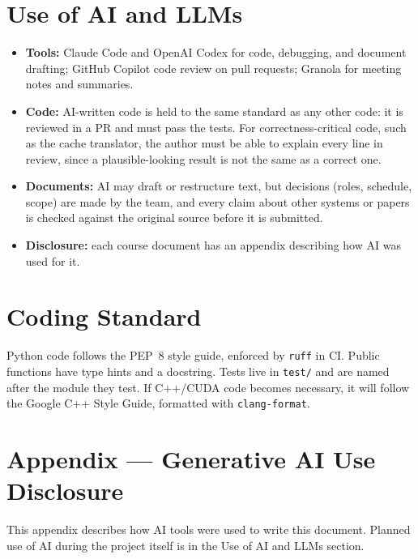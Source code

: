 \documentclass{article}
\begin{document}
\section{Use of AI and LLMs}

\begin{itemize}
  \item \textbf{Tools:} Claude Code and OpenAI Codex for code, debugging,
  and document drafting; GitHub Copilot code review on pull requests;
  Granola for meeting notes and summaries.
  \item \textbf{Code:} AI-written code is held to the same standard as any
  other code: it is reviewed in a PR and must pass the tests. For
  correctness-critical code, such as the cache translator, the author must
  be able to explain every line in review, since a plausible-looking
  result is not the same as a correct one.
  \item \textbf{Documents:} AI may draft or restructure text, but decisions
  (roles, schedule, scope) are made by the team, and every claim about
  other systems or papers is checked against the original source before
  it is submitted.
  \item \textbf{Disclosure:} each course document has an appendix
  describing how AI was used for it.
\end{itemize}

\section{Coding Standard}
\label{sec:standard}

Python code follows the PEP~8 style guide, enforced by \texttt{ruff} in CI.
Public functions
have type hints and a docstring. Tests live in \texttt{test/} and are named
after the module they test. If C++/CUDA code becomes necessary, it will
follow the Google C++ Style Guide, formatted with \texttt{clang-format}.




\newpage{}

\section{Appendix --- Generative AI Use Disclosure}

This appendix describes how AI tools were used to write this document.
Planned use of AI during the project itself is in the Use of AI and LLMs
section.
\end{document}

